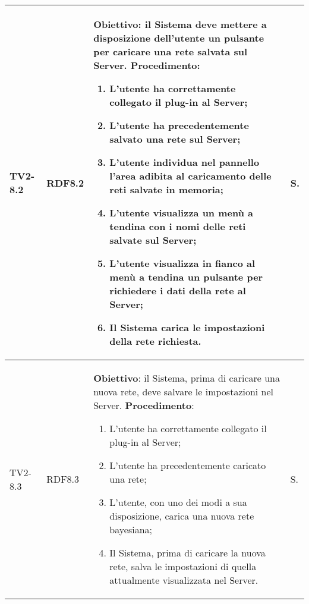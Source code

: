 \begin{longtable}{|C{.15\textwidth}|C{.13\textwidth}|m{.65\textwidth}|C{.08\textwidth}|}
TV2-8.2 & RDF8.2 &
	\textbf{Obiettivo}: il Sistema deve mettere a disposizione dell'utente un pulsante per caricare una rete salvata sul Server. \newline
	\textbf{Procedimento}:
	\begin{enumerate}
		\item L'utente ha correttamente collegato il plug-in al Server;
		\item L'utente ha precedentemente salvato una rete sul Server;
		\item L'utente individua nel pannello l'area adibita al caricamento delle reti salvate in memoria;
		\item L'utente visualizza un menù a tendina con i nomi delle reti salvate sul Server;
		\item L'utente visualizza in fianco al menù a tendina un pulsante per richiedere i dati della rete al Server;
		\item Il Sistema carica le impostazioni della rete richiesta.
	\end{enumerate}
	& S. \\
\hline

TV2-8.3 & RDF8.3 &
	\textbf{Obiettivo}: il Sistema, prima di caricare una nuova rete, deve salvare le impostazioni nel Server. \newline
	\textbf{Procedimento}:
	\begin{enumerate}
		\item L'utente ha correttamente collegato il plug-in al Server;
		\item L'utente ha precedentemente caricato una rete;
		\item L'utente, con uno dei modi a sua disposizione, carica una nuova rete bayesiana;
		\item Il Sistema, prima di caricare la nuova rete, salva le impostazioni di quella attualmente visualizzata nel Server.
	\end{enumerate}
	& S. \\
\hline	


\end{longtable}
